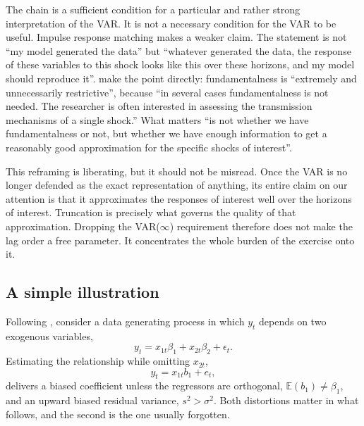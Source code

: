 The chain is a sufficient condition for a particular and rather strong interpretation of the
VAR. It is not a necessary condition for the VAR to be useful. Impulse response matching makes
a weaker claim. The statement is not ``my model generated the data'' but ``whatever generated
the data, the response of these variables to this shock looks like this over these horizons,
and my model should reproduce it''. \citet{Forni_Gambetti_Sala2016} make the point directly:
fundamentalness is ``extremely and unnecessarily restrictive'', because ``in several cases
fundamentalness is not needed. The researcher is often interested in assessing the transmission
mechanisms of a single shock.'' What matters ``is not whether we have fundamentalness or not,
but whether we have enough information to get a reasonably good approximation for the specific
shocks of interest''.

This reframing is liberating, but it should not be misread. Once the VAR is no longer defended
as the exact representation of anything, its entire claim on our attention is that it
approximates the responses of interest well over the horizons of interest. Truncation is
precisely what governs the quality of that approximation. Dropping the VAR($\infty$)
requirement therefore does not make the lag order a free parameter. It concentrates the whole
burden of the exercise onto it.

\subsection{A simple illustration}

Following \citet{Long_Lag2025}, consider a data generating process in which $y_t$ depends on
two exogenous variables,
\begin{equation}
    y_t = x_{1t}\beta_1 + x_{2t}\beta_2 + \epsilon_t .
\end{equation}
Estimating the relationship while omitting $x_{2t}$,
\begin{equation}
    y_t = x_{1t} b_1 + e_t ,
\end{equation}
delivers a biased coefficient unless the regressors are orthogonal,
$\mathbb{E}(b_1)\neq\beta_1$, and an upward biased residual variance, $s^2 > \sigma^2$. Both
distortions matter in what follows, and the second is the one usually forgotten.

